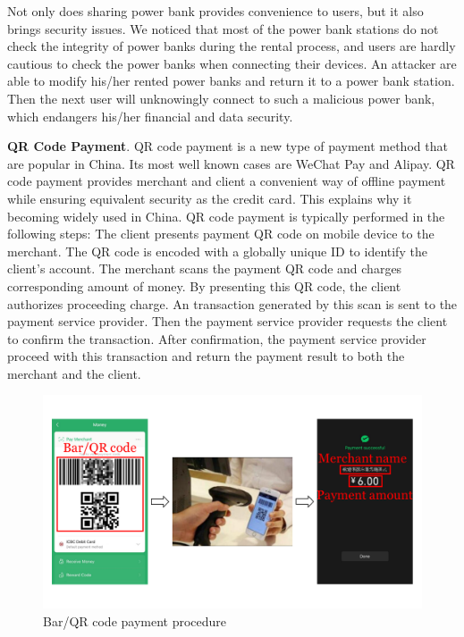 

Not only does sharing power bank provides convenience to users, but it also brings security issues. 
We noticed that most of the power bank stations do not check the integrity of power banks during the rental process, and users are hardly cautious to check the power banks when connecting their devices. 
An attacker are able to modify his/her rented power banks and return it to a power bank station.
Then the next user will unknowingly connect to such a malicious power bank, which endangers his/her financial and data security.


\textbf{QR Code Payment}. 
QR code payment is a new type of payment method that are popular in China. Its most well known cases are WeChat Pay and Alipay. QR code payment provides merchant and client a convenient way of offline payment while ensuring equivalent security as the credit card. This explains why it becoming widely used in China.
QR code payment is typically performed in the following steps:
 The client presents payment QR code on mobile device to the merchant. 
The QR code is encoded with a globally unique ID to identify the client's account. 
 The merchant scans the payment QR code and charges corresponding amount of money. 
By presenting this QR code, the client authorizes proceeding charge.
 An transaction generated by this scan is sent to the payment service provider. 
Then the payment service provider requests the client to confirm the transaction.
 After confirmation, the payment service provider proceed with this transaction and return the payment result to both the merchant and the client.

\begin{figure}[t]
	\centering
	\includegraphics[width=\linewidth]{./Figs/qr_code_payment.png}
	\caption{Bar/QR code payment procedure}
	\label{fig:qr_payment_procedure}
\end{figure}


